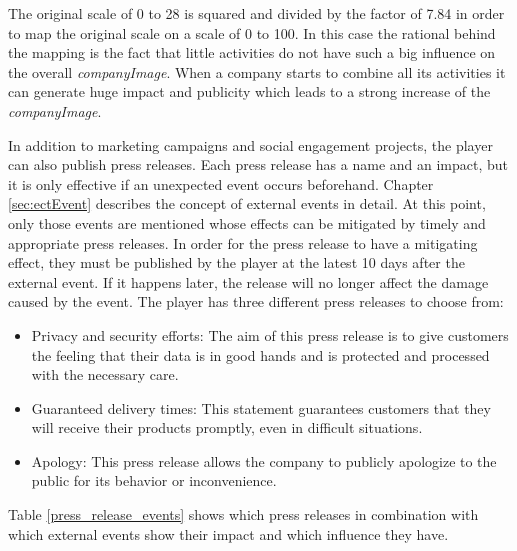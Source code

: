 The original scale of 0 to 28 is squared and divided by the factor of 7.84 in order to map the original scale on a scale of 0 to 100. In this case the rational behind the mapping is the fact that little activities do not have such  a big influence on the overall \textit{companyImage}. When a company starts to combine all its activities it can generate huge impact and publicity which leads to a strong increase of the \textit{companyImage}.

In addition to marketing campaigns and social engagement projects, the player can also publish press releases. Each press release has a name and an impact, but it is only effective if an unexpected event occurs beforehand. Chapter \ref{sec:ectEvent} describes the concept of external events in detail. At this point, only those events are mentioned whose effects can be mitigated by timely and appropriate press releases.
In order for the press release to have a mitigating effect, they must be published by the player at the latest 10 days after the external event. If it happens later, the release will no longer affect the damage caused by the event. The player has three different press releases to choose from: 
\begin{itemize}
    \item Privacy and security efforts: The aim of this press release is to give customers the feeling that their data is in good hands and is protected and processed with the necessary care.  
    \item Guaranteed delivery times: This statement guarantees customers that they will receive their products promptly, even in difficult situations. 
    \item Apology: This press release allows the company to publicly apologize to the public for its behavior or inconvenience.
\end{itemize}

Table \ref{press_release_events} shows which press releases in combination with which external events show their impact and which influence they have.

